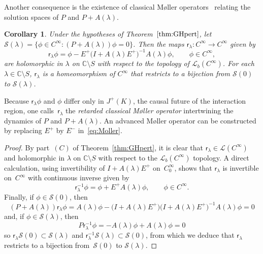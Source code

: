 \documentclass[pdftex]{sigma}
\numberwithin{equation}{section}
\newtheorem{Corollary}[Theorem]{Corollary}
\newcommand{\CC}{{\mathbb C}}
\newcommand{\LL}{{\mathcal L}}
\newcommand{\Sf}{{\mathscr S}}
\begin{document}
 Another consequence is the existence of classical M{\o}ller operators~\cite{DuetschFredenhagen:2003,HawRej:2020} relating the solution spaces of $P$ and $P+A(\lambda)$.
 \begin{Corollary}
 	Under the hypotheses of Theorem~$\ref{thm:GHpert}$,
 	let $\Sf(\lambda)=\{\phi\in C^\infty\colon (P+A(\lambda))\phi=0\}$. Then the maps
 	$\mathsf{r}_\lambda:C^\infty\to C^\infty$ given by
 	\begin{equation}\label{eq:Moller}
 		\mathsf{r}_\lambda \phi = \phi - E^+\big(I+A(\lambda)E^+\big)^{-1}A(\lambda)\phi,
 		\qquad \phi\in C^\infty,
 	\end{equation}
 	are holomorphic in $\lambda$ on $\CC\setminus S$ with respect to the topology of $\LL_b(C^\infty)$. For each $\lambda\in \CC\setminus S$, $\mathsf{r}_\lambda$ is a homeomorphism of $C^\infty$ that restricts to a bijection from $\Sf(0)$ to $\Sf(\lambda)$.
 \end{Corollary}
 Because $\mathsf{r}_\lambda \phi$ and $\phi$ differ only in $J^+(K)$, the causal future of the interaction region, one calls~$\mathsf{r}_\lambda$ the \emph{retarded classical M{\o}ller operator} intertwining the dynamics of $P$ and $P+A(\lambda)$. An advanced M{\o}ller operator can be constructed by replacing $E^+$ by $E^-$ in~\eqref{eq:Moller}.
 \begin{proof}
 	By part~$(C)$ of Theorem~\ref{thm:GHpert}, it is clear that $\mathsf{r}_\lambda\in \LL(C^\infty)$ and holomorphic in $\lambda$ on $\CC\setminus S$ with respect to the $\LL_b(C^\infty)$ topology.
 	A direct calculation, using invertibility of $I+A(\lambda)E^+$ on~$C_0^\infty$, shows that $\mathsf{r}_\lambda$ is invertible on~$C^\infty$ with continuous inverse given by
 	\begin{equation*}
 		\mathsf{r}_\lambda^{-1}\phi = \phi + E^+A(\lambda)\phi, \qquad \phi\in C^\infty.
 	\end{equation*}
 	Finally, if $\phi\in \Sf(0)$, then
 	\begin{equation*}
 		(P+A(\lambda))\mathsf{r}_\lambda\phi = A(\lambda)\phi -
 		\big(I+A(\lambda)E^+\big)\big(I+A(\lambda)E^+\big)^{-1}A(\lambda)\phi =0
 	\end{equation*}
 	and, if $\phi\in \Sf(\lambda)$, then
 	\begin{equation*}
 		P\mathsf{r}_\lambda^{-1}\phi= -A(\lambda)\phi + A(\lambda)\phi= 0
 	\end{equation*}
 	so $\mathsf{r}_\lambda\Sf(0)\subset \Sf(\lambda)$ and $\mathsf{r}_\lambda^{-1}\Sf(\lambda)\subset \Sf(0)$, from which we deduce that $\mathsf{r}_\lambda$ restricts to a bijection from~$\Sf(0)$ to $\Sf(\lambda)$.
 \end{proof}
\end{document}
